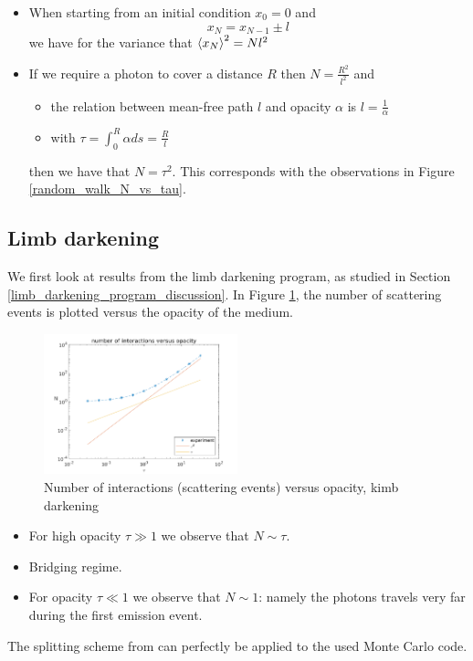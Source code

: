 \documentclass[../main/main.tex]{subfiles}
\begin{document}
\begin{itemize}
\item When starting from an initial condition $x_0 = 0$ and 
\begin{equation}
x_N = x_{N-1} \pm l
\end{equation}
we have for the variance that $\braket{x_N}^2 = N l^2$ 
\item If we require a photon to cover a distance $R$ then $N = \frac{R^2}{l^2}$ and
\begin{itemize}
\item the relation between mean-free path $l$ and opacity $\alpha$ is $l = \frac{1}{\alpha}$
\item with $\tau = \int_0^R \alpha ds = \frac{R}{l}$
\end{itemize}
then we have that $N = \tau^2$. This corresponds with the observations in Figure \ref{random_walk_N_vs_tau}.
\end{itemize}

\newpage
\subsection{Limb darkening} We first look at results from the limb darkening program, as studied in Section \ref{limb_darkening_program_discussion}. In Figure \ref{limb_darkening_N_vs_tau}, the number of scattering events is plotted versus the opacity of the medium. 

	\begin{figure}[!htp]
	\centering
	\includegraphics[width=0.5\textwidth]{../../introductory_exercises/limb_darkening/data/N_vs_opacity.png}
	\caption{Number of interactions (scattering events) versus 	opacity, kimb darkening}
	\label{limb_darkening_N_vs_tau}
	\end{figure}

\begin{itemize}
\item For high opacity $\tau \gg 1$ we observe that $N \sim \tau$. \item Bridging regime.
\item For opacity $\tau \ll 1$ we observe that $N \sim 1$: namely the photons travels very far during the first emission event.
\end{itemize}

The splitting scheme from \cite{Dimarco2018} can perfectly be applied to the used Monte Carlo code.


\noindent{}
\end{document}
